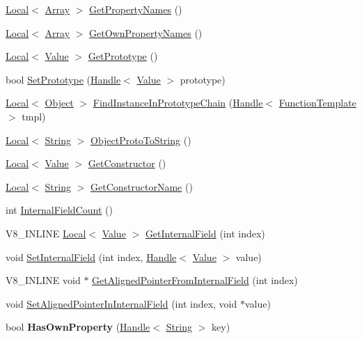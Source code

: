 \begin{DoxyCompactItemize}
\item 
\hyperlink{classv8_1_1_local}{Local}$<$ \hyperlink{classv8_1_1_array}{Array} $>$ \hyperlink{classv8_1_1_object_a9f45786246c6e6027b32f685d900a41f}{Get\+Property\+Names} ()
\item 
\hyperlink{classv8_1_1_local}{Local}$<$ \hyperlink{classv8_1_1_array}{Array} $>$ \hyperlink{classv8_1_1_object_aeb48075bdfb7b2b49fe08361a6c4d2a8}{Get\+Own\+Property\+Names} ()
\item 
\hyperlink{classv8_1_1_local}{Local}$<$ \hyperlink{classv8_1_1_value}{Value} $>$ \hyperlink{classv8_1_1_object_ae8d3fed7d6dbd667c29cabb3039fe7af}{Get\+Prototype} ()
\item 
bool \hyperlink{classv8_1_1_object_ab54bbd70d60e62d8bc22a8c8a6be593e}{Set\+Prototype} (\hyperlink{classv8_1_1_handle}{Handle}$<$ \hyperlink{classv8_1_1_value}{Value} $>$ prototype)
\item 
\hyperlink{classv8_1_1_local}{Local}$<$ \hyperlink{classv8_1_1_object}{Object} $>$ \hyperlink{classv8_1_1_object_ab2c5f7369abf08ae8f44dc84f5aa335a}{Find\+Instance\+In\+Prototype\+Chain} (\hyperlink{classv8_1_1_handle}{Handle}$<$ \hyperlink{classv8_1_1_function_template}{Function\+Template} $>$ tmpl)
\item 
\hyperlink{classv8_1_1_local}{Local}$<$ \hyperlink{classv8_1_1_string}{String} $>$ \hyperlink{classv8_1_1_object_aeb2f524c806075e5f9032a24afd86869}{Object\+Proto\+To\+String} ()
\item 
\hyperlink{classv8_1_1_local}{Local}$<$ \hyperlink{classv8_1_1_value}{Value} $>$ \hyperlink{classv8_1_1_object_a6265087e94f67370247cbc7beeedac62}{Get\+Constructor} ()
\item 
\hyperlink{classv8_1_1_local}{Local}$<$ \hyperlink{classv8_1_1_string}{String} $>$ \hyperlink{classv8_1_1_object_a7bbe987794658f20a3ec1b68326305e6}{Get\+Constructor\+Name} ()
\item 
int \hyperlink{classv8_1_1_object_aaec28576353eebe6fee113bce2718ecc}{Internal\+Field\+Count} ()
\item 
V8\+\_\+\+I\+N\+L\+I\+N\+E \hyperlink{classv8_1_1_local}{Local}$<$ \hyperlink{classv8_1_1_value}{Value} $>$ \hyperlink{classv8_1_1_object_aa3324fdf652d8ac3b2f27faa0559231d}{Get\+Internal\+Field} (int index)
\item 
void \hyperlink{classv8_1_1_object_a361b1781e7db29b17b063ef31315989e}{Set\+Internal\+Field} (int index, \hyperlink{classv8_1_1_handle}{Handle}$<$ \hyperlink{classv8_1_1_value}{Value} $>$ value)
\item 
V8\+\_\+\+I\+N\+L\+I\+N\+E void $\ast$ \hyperlink{classv8_1_1_object_a435f68bb7ef0f64dd522c5c910682448}{Get\+Aligned\+Pointer\+From\+Internal\+Field} (int index)
\item 
void \hyperlink{classv8_1_1_object_a0ccba69581f0b5e4e672bab90f26879b}{Set\+Aligned\+Pointer\+In\+Internal\+Field} (int index, void $\ast$value)
\item 
\hypertarget{classv8_1_1_object_a3ec4bcaa4e875987cc1845820a733777}{}bool {\bfseries Has\+Own\+Property} (\hyperlink{classv8_1_1_handle}{Handle}$<$ \hyperlink{classv8_1_1_string}{String} $>$ key)\label{classv8_1_1_object_a3ec4bcaa4e875987cc1845820a733777}


\end{DoxyCompactItemize}
